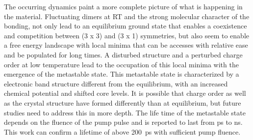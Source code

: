 The occurring dynamics paint a more complete picture of what is happening in the material.
Fluctuating  dimers at RT and the strong molecular character of the bonding, not only lead to an equilibrium ground state that enables a coexistence and competition between (3 x 3) and (3 x 1) symmetries, but also seem to enable a free energy landscape with local minima that can be accesses with relative ease and be populated for long times.
A disturbed structure and a perturbed charge order at low temperature lead to the occupation of this local minima with the emergence of the metastable state.
This metastable state is characterized by a electronic band structure different from the equilibrium, with an increased chemical potential and shifted core levels.
It is possible that charge order as well as the crystal structure have formed differently than at equilibrium, but future studies need to address this in more depth.
The life time of the metastable state depends on the fluence of the pump pulse and is reported to last from \unit{\pico\second} to \unit{\nano\second}.
This work can confirm a lifetime of above \qty{200}{\pico\second} with sufficient pump fluence.
